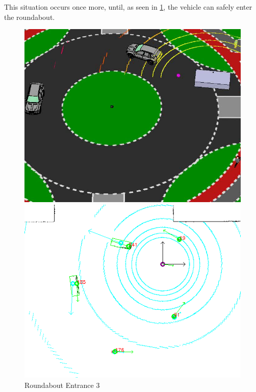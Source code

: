 \documentclass[11pt,oneside,openright]{mpreport}
\begin{document}
This situation occurs once more, until, as seen in \cref{roundabout_entrance_3}, the vehicle can safely enter the roundabout.

\begin{figure}[htb]
  \caption{Roundabout Entrance 3} 
    \centering
    \begin{minipage}[t]{0.49\textwidth}
        \centering
          \includegraphics[width=\textwidth]{bilder/sim05.png}
    \end{minipage}%
    \hfill
    \begin{minipage}[t]{0.49\textwidth}
        \centering
	\includegraphics[width=\textwidth]{bilder/sim06.png}
    \end{minipage}
    \label{roundabout_entrance_3}
\end{figure}
\end{document}
